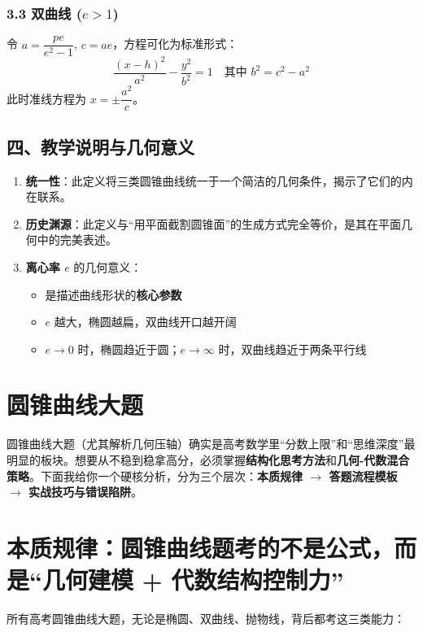 \documentclass{article}
\begin{document}
	\subsubsection*{3.3 双曲线 (\( e > 1 \))}
	令 \( a = \dfrac{p e}{e^2 - 1} \), \( c = ae \)，方程可化为标准形式：
	\[
	\frac{(x - h)^2}{a^2} - \frac{y^2}{b^2} = 1 \quad \text{其中 } b^2 = c^2 - a^2
	\]
	此时准线方程为 \( x = \pm \dfrac{a^2}{c} \)。
	
	\subsection*{四、教学说明与几何意义}
	
	\begin{enumerate}
		\item \textbf{统一性}：此定义将三类圆锥曲线统一于一个简洁的几何条件，揭示了它们的内在联系。
		
		\item \textbf{历史渊源}：此定义与“用平面截割圆锥面”的生成方式完全等价，是其在平面几何中的完美表述。
		
		\item \textbf{离心率 \( e \)} 的几何意义：
		\begin{itemize}
			\item 是描述曲线形状的\textbf{核心参数}
			\item \( e \) 越大，椭圆越扁，双曲线开口越开阔
			\item \( e \to 0 \) 时，椭圆趋近于圆；\( e \to \infty \) 时，双曲线趋近于两条平行线
		\end{itemize}
	\end{enumerate}


\section{圆锥曲线大题}
	
	圆锥曲线大题（尤其解析几何压轴）确实是高考数学里``分数上限''和``思维深度''最明显的板块。想要从不稳到稳拿高分，必须掌握\textbf{结构化思考方法}和\textbf{几何-代数混合策略}。下面我给你一个硬核分析，分为三个层次：\textbf{本质规律 $\rightarrow$ 答题流程模板 $\rightarrow$ 实战技巧与错误陷阱}。
	
	
	\section{本质规律：圆锥曲线题考的不是公式，而是``几何建模 + 代数结构控制力''}
	
	所有高考圆锥曲线大题，无论是椭圆、双曲线、抛物线，背后都考这三类能力：
	
\end{document}
